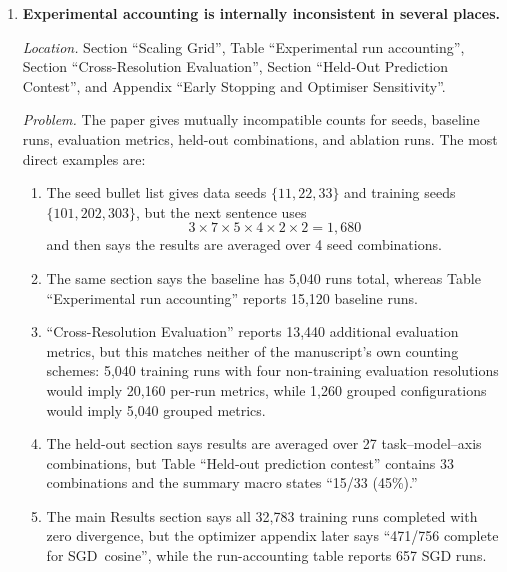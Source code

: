 \documentclass[11pt]{article}
\begin{document}
\begin{enumerate}
\item \textbf{Experimental accounting is internally inconsistent in several places.}

\emph{Location.} Section ``Scaling Grid'', Table ``Experimental run accounting'', Section ``Cross-Resolution Evaluation'', Section ``Held-Out Prediction Contest'', and Appendix ``Early Stopping and Optimiser Sensitivity''.

\emph{Problem.} The paper gives mutually incompatible counts for seeds, baseline runs, evaluation metrics, held-out combinations, and ablation runs. The most direct examples are:
\begin{enumerate}
  \item The seed bullet list gives data seeds $\{11,22,33\}$ and training seeds $\{101,202,303\}$, but the next sentence uses
  \[
    3 \times 7 \times 5 \times 4 \times 2 \times 2 = 1{,}680
  \]
  and then says the results are averaged over 4 seed combinations.
  \item The same section says the baseline has 5{,}040 runs total, whereas Table ``Experimental run accounting'' reports 15{,}120 baseline runs.
  \item ``Cross-Resolution Evaluation'' reports 13{,}440 additional evaluation metrics, but this matches neither of the manuscript's own counting schemes: 5{,}040 training runs with four non-training evaluation resolutions would imply 20{,}160 per-run metrics, while 1{,}260 grouped configurations would imply 5{,}040 grouped metrics.
  \item The held-out section says results are averaged over 27 task--model--axis combinations, but Table ``Held-out prediction contest'' contains 33 combinations and the summary macro states ``15/33 (45\%).''
  \item The main Results section says all 32{,}783 training runs completed with zero divergence, but the optimizer appendix later says ``471/756 complete for SGD~cosine'', while the run-accounting table reports 657 SGD runs.
\end{enumerate}


\end{enumerate}
\end{document}
